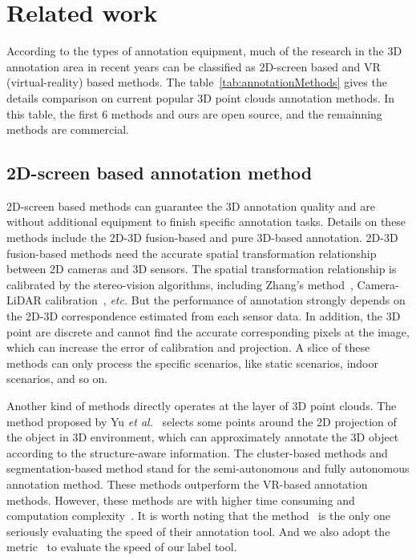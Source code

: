 \documentclass[letterpaper, 10 pt, conference]{ieeeconf}  %
\begin{document}
\section{Related work}
\label{Realtedwork}
According to the types of annotation equipment, much of the research in the 3D annotation area in recent years can be classified as 2D-screen based and VR (virtual-reality) based methods. The table~\ref{tab:annotationMethods} gives the details comparison on current popular 3D point clouds annotation methods. In this table, the first 6 methods and ours are open source, and the remainning methods are commercial.
\subsection{2D-screen based annotation method}
2D-screen based methods can guarantee the 3D annotation quality and are without additional equipment to finish specific annotation tasks.
Details on these methods include the 2D-3D fusion-based and pure 3D-based annotation.
2D-3D fusion-based methods need the accurate spatial transformation relationship between 2D cameras and 3D sensors.
The spatial transformation relationship is calibrated by the stereo-vision algorithms, including Zhang's method~\cite{zhangzhegnyou}, Camera-LiDAR calibration~\cite{roadCalibration}, \emph{etc.}
But the performance of annotation strongly depends on the 2D-3D correspondence estimated from each sensor data. In addition, the 3D point are discrete and cannot find the accurate corresponding pixels at the image, which can increase the error of calibration and projection. A slice of these methods can only process the specific scenarios, like static scenarios, indoor scenarios, and so on.

Another kind of methods directly operates at the layer of 3D point clouds.
The method proposed by Yu \textit{et al.}~\cite{yu2012efficient} selects some points around the 2D projection of the object in 3D environment, which can approximately annotate the 3D object according to the structure-aware information. The cluster-based methods and segmentation-based method stand for the semi-autonomous and fully autonomous annotation method.
These methods outperform the VR-based annotation methods. However, these methods are with higher time consuming and computation complexity~\cite{pointatme}. It is worth noting that the method~\cite{monica2017multi} is the only one seriously evaluating the speed of their annotation tool. And we also adopt the metric~\cite{monica2017multi} to evaluate the speed of our label tool.
\end{document}
